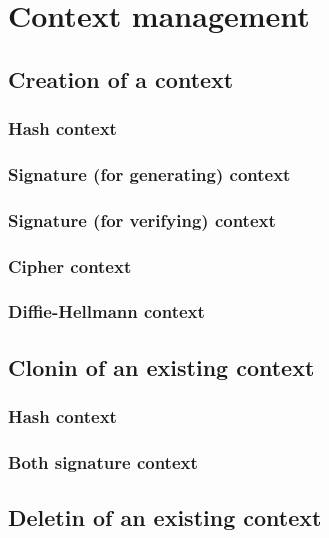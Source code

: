 \chapter{Context management}

\section{Creation of a context}
\subsection{Hash context}
\subsection{Signature (for generating) context}
\subsection{Signature (for verifying) context}
\subsection{Cipher context}
\subsection{Diffie-Hellmann context}


\section{Clonin of an existing context}
\subsection{Hash context}
\subsection{Both signature context}

\section{Deletin of an existing context}